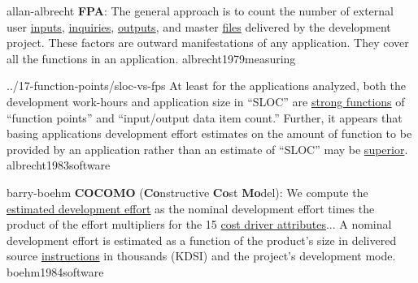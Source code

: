 \documentclass{article}
\begin{document}
\lnQuote
  {allan-albrecht}
  {\textbf{FPA}: The general approach is to count the number of external user \ul{inputs}, \ul{inquiries}, \ul{outputs}, and master \ul{files} delivered by the development project. These factors are outward manifestations of any application. They cover all the functions in an application.}
  {albrecht1979measuring}

\lnQuote
  {../17-function-points/sloc-vs-fps}
  {At least for the applications analyzed, both the development work-hours and application size in ``SLOC'' are \ul{strong functions} of ``function points'' and ``input/output data item count.'' Further, it appears that basing applications development effort estimates on the amount of function to be provided by an application rather than an estimate of ``SLOC'' may be \ul{superior}.}
  {albrecht1983software}

\lnQuote
  {barry-boehm}
  {\textbf{COCOMO} (\textbf{Co}nstructive \textbf{Co}st \textbf{Mo}del): We compute the \ul{estimated development effort} as the nominal development effort times the product of the effort multipliers for the 15 \ul{cost driver attributes}... A nominal development effort is estimated as a function of the product's size in delivered source \ul{instructions} in thousands (KDSI) and the project's development mode.}
  {boehm1984software}
\end{document}
